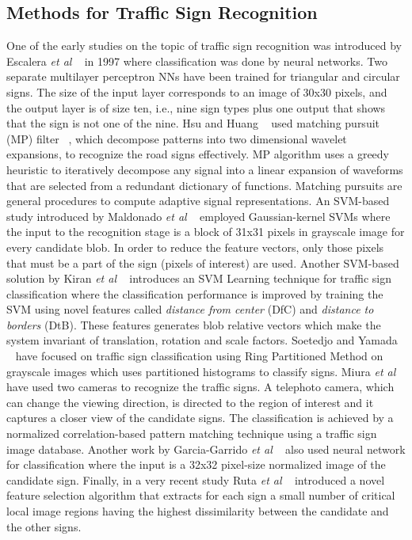 \documentclass[a4paper,oneside,12pt]{report}
\begin{document}
\subsection{Methods for Traffic Sign Recognition}
One of the early studies on the topic of traffic sign recognition was introduced by Escalera \textit{et al} ~\cite{de_la_escalera_road_1997} in 1997 where classification was done by neural networks. Two separate multilayer perceptron NNs have been trained for triangular and circular signs. The size of the input layer corresponds to an image of 30x30 pixels, and the output layer is of size ten, i.e., nine sign types plus one output that shows that the sign is not one of the nine. Hsu and Huang ~\cite{hsu_road_2001} used matching pursuit (MP) filter ~\cite{mallat_matching_1993}, which decompose patterns into  two dimensional wavelet expansions,  to recognize the road signs effectively. MP algorithm uses a greedy heuristic to iteratively decompose any signal into a linear expansion of waveforms that are selected from a redundant dictionary of functions. Matching pursuits are general procedures to compute adaptive signal representations. An SVM-based study introduced by Maldonado \textit{et al} ~\cite{maldonado-bascon_road-sign_2007} employed Gaussian-kernel SVMs where the input to the recognition stage is a block of 31x31 pixels in grayscale image for every candidate blob. In order to reduce the feature vectors, only those pixels that must be a part of the sign (pixels of interest) are used. Another SVM-based solution by Kiran \textit{et al} ~\cite{kiran_traffic_2009} introduces an SVM Learning technique for traffic sign classification where the classification performance is improved by training the SVM using novel features called \textit{distance from center} (DfC) and \textit{distance to borders} (DtB). These features generates blob relative vectors which make the system invariant of translation, rotation and scale factors. Soetedjo and Yamada ~\cite{soetedjo_traffic_2005} have focused on traffic sign classification using Ring Partitioned Method on grayscale images which uses partitioned histograms to classify signs. Miura \textit{et al} ~\cite{miura_active_2000} have used two cameras to recognize the traffic signs. A telephoto camera, which can change the viewing direction, is directed to the region of interest and it captures a closer view of the candidate signs. The classification is achieved by a normalized correlation-based pattern matching technique using a traffic sign image database. Another work by Garcia-Garrido \textit{et al} ~\cite{garcia-garrido_fast_2006} also used neural network for classification where the input is a 32x32 pixel-size normalized image of the candidate sign. Finally, in a very recent study Ruta \textit{et al} ~\cite{ruta_real-time_2010} introduced a novel feature selection algorithm that extracts for each sign a small number of critical local image regions having the highest dissimilarity between the candidate and the other signs. 
\end{document}
